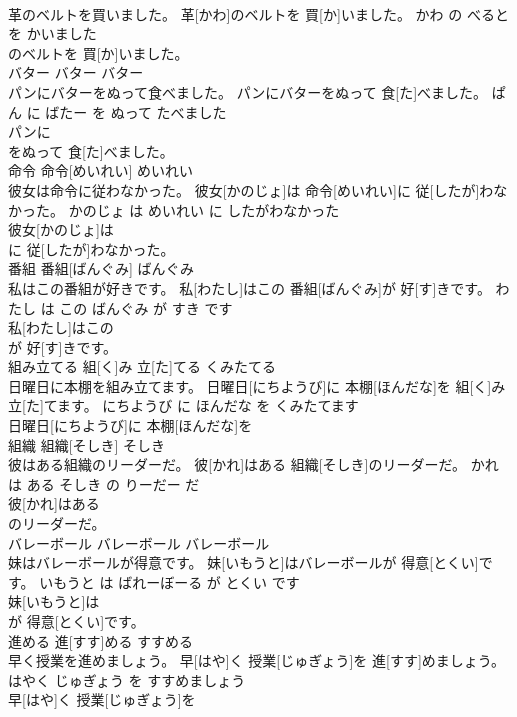 \documentclass[8pt]{extreport}
\begin{document}
\begin{CJK}{UTF8}{min}
\\	革のベルトを買いました。	革[かわ]のベルトを 買[か]いました。	かわ の べると を かいました	
\\	のベルトを 買[か]いました。		
\\	バター	バター	バター	
\\	パンにバターをぬって食べました。	パンにバターをぬって 食[た]べました。	ぱん に ばたー を ぬって たべました	
\\	パンに
\\	をぬって 食[た]べました。		
\\	命令	命令[めいれい]	めいれい	
\\	彼女は命令に従わなかった。	彼女[かのじょ]は 命令[めいれい]に 従[したが]わなかった。	かのじょ は めいれい に したがわなかった	
\\	彼女[かのじょ]は
\\	に 従[したが]わなかった。		
\\	番組	番組[ばんぐみ]	ばんぐみ	
\\	私はこの番組が好きです。	私[わたし]はこの 番組[ばんぐみ]が 好[す]きです。	わたし は この ばんぐみ が すき です	
\\	私[わたし]はこの
\\	が 好[す]きです。		
\\	組み立てる	組[く]み 立[た]てる	くみたてる	
\\	日曜日に本棚を組み立てます。	日曜日[にちようび]に 本棚[ほんだな]を 組[く]み 立[た]てます。	にちようび に ほんだな を くみたてます	
\\	日曜日[にちようび]に 本棚[ほんだな]を
\\	組織	組織[そしき]	そしき	
\\	彼はある組織のリーダーだ。	彼[かれ]はある 組織[そしき]のリーダーだ。	かれ は ある そしき の りーだー だ	
\\	彼[かれ]はある
\\	のリーダーだ。		
\\	バレーボール	バレーボール	バレーボール	
\\	妹はバレーボールが得意です。	妹[いもうと]はバレーボールが 得意[とくい]です。	いもうと は ばれーぼーる が とくい です	
\\	妹[いもうと]は
\\	が 得意[とくい]です。		
\\	進める	進[すす]める	すすめる	
\\	早く授業を進めましょう。	早[はや]く 授業[じゅぎょう]を 進[すす]めましょう。	はやく じゅぎょう を すすめましょう	
\\	早[はや]く 授業[じゅぎょう]を

\end{CJK}
\end{document}
